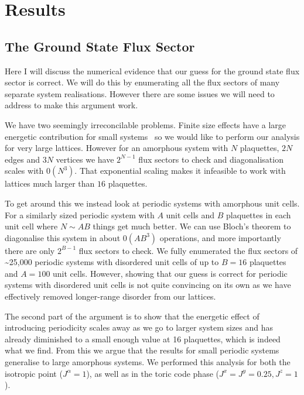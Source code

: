 \hypertarget{amk-results}{%
\section{Results}\label{amk-results}}

\hypertarget{the-ground-state-flux-sector}{%
\subsection{The Ground State Flux Sector}\label{the-ground-state-flux-sector}}

Here I will discuss the numerical evidence that our guess for the ground state flux sector is correct. We will do this by enumerating all the flux sectors of many separate system realisations. However there are some issues we will need to address to make this argument work.

We have two seemingly irreconcilable problems. Finite size effects have a large energetic contribution for small systems~\autocite{kitaevAnyonsExactlySolved2006} so we would like to perform our analysis for very large lattices. However for an amorphous system with \(N\) plaquettes, \(2N\) edges and \(3N\) vertices we have \(2^{N-1}\) flux sectors to check and diagonalisation scales with \(\mathcal{0}(N^3)\). That exponential scaling makes it infeasible to work with lattices much larger than \(16\) plaquettes.

To get around this we instead look at periodic systems with amorphous unit cells. For a similarly sized periodic system with \(A\) unit cells and \(B\) plaquettes in each unit cell where \(N \sim AB\) things get much better. We can use Bloch's theorem to diagonalise this system in about \(\mathcal{0}(A B^3)\) operations, and more importantly there are only \(2^{B-1}\) flux sectors to check. We fully enumerated the flux sectors of \textasciitilde25,000 periodic systems with disordered unit cells of up to \(B = 16\) plaquettes and \(A = 100\) unit cells. However, showing that our guess is correct for periodic systems with disordered unit cells is not quite convincing on its own as we have effectively removed longer-range disorder from our lattices.

The second part of the argument is to show that the energetic effect of introducing periodicity scales away as we go to larger system sizes and has already diminished to a small enough value at 16 plaquettes, which is indeed what we find. From this we argue that the results for small periodic systems generalise to large amorphous systems. We performed this analysis for both the isotropic point (\(J^\alpha = 1\)), as well as in the toric code phase (\(J^x = J^y = 0.25, J^z = 1\)).

